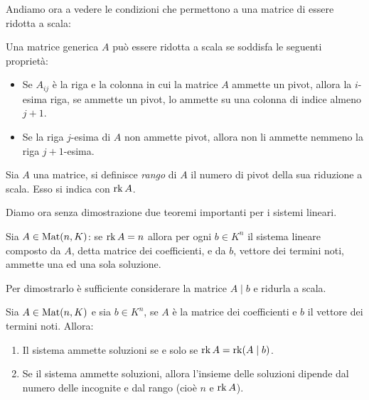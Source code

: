 Andiamo ora a vedere le condizioni che permettono a una matrice di essere ridotta a scala:
\begin{proprieta} \label{pr:pivot-riduzione-scala}
	Una matrice generica $A$ può essere ridotta a scala se soddisfa le seguenti proprietà:
	\begin{itemize}
		\item Se $A_{ij}$ è la riga e la colonna in cui la matrice $A$ ammette un pivot, allora la $i$-esima riga, se ammette un pivot, lo ammette su una colonna di indice almeno $j+1$.
		\item Se la riga $j$-esima di $A$ non ammette pivot, allora non li ammette nemmeno la riga $j+1$-esima.
	\end{itemize}
\end{proprieta}
\begin{definizione}
	Sia $A$ una matrice, si definisce \emph{rango} di $A$ il numero di pivot della sua riduzione a scala.
	Esso si indica con $\operatorname{rk} A$.
\end{definizione}
Diamo ora senza dimostrazione due teoremi importanti per i sistemi lineari.
\begin{teorema}[di Cramer] \label{t:cramer}
	Sia $A\in\operatorname{Mat}(n,K)$: se $\operatorname{rk} A=n$ allora per ogni $b\in K^n$ il sistema lineare composto da $A$, detta matrice dei coefficienti, e da $b$, vettore dei termini noti, ammette una ed una sola soluzione.
\end{teorema}
Per dimostrarlo è sufficiente considerare la matrice $A\mid b$ e ridurla a scala.
\begin{teorema} \label{t:rouche-capelli}
	Sia $A\in\operatorname{Mat}(n,K)$ e sia $b\in K^n$, se $A$ è la matrice dei coefficienti e $b$ il vettore dei termini noti.
	Allora:
	\begin{enumerate}
		\item Il sistema ammette soluzioni se e solo se $\operatorname{rk} A=\operatorname{rk}(A\mid b)$.
		\item Se il sistema ammette soluzioni, allora l'insieme delle soluzioni dipende dal numero delle incognite e dal rango (cioè $n$ e $\operatorname{rk} A$).
	\end{enumerate}
\end{teorema}

